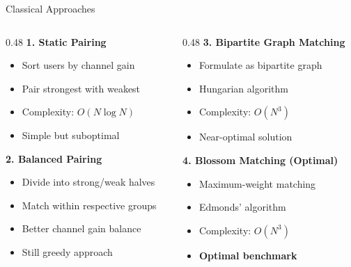 \documentclass[aspectratio=169]{beamer}
\begin{document}
\begin{frame}{Classical Approaches}
    \begin{columns}
        \begin{column}{0.48\textwidth}
            \textbf{1. Static Pairing}
            \begin{itemize}
                \item Sort users by channel gain
                \item Pair strongest with weakest
                \item Complexity: $O(N \log N)$
                \item Simple but suboptimal
            \end{itemize}
            
            \vspace{0.4cm}
            
            \textbf{2. Balanced Pairing}
            \begin{itemize}
                \item Divide into strong/weak halves
                \item Match within respective groups
                \item Better channel gain balance
                \item Still greedy approach
            \end{itemize}
        \end{column}
        
        \begin{column}{0.48\textwidth}
            \textbf{3. Bipartite Graph Matching}
            \begin{itemize}
                \item Formulate as bipartite graph
                \item Hungarian algorithm
                \item Complexity: $O(N^3)$
                \item Near-optimal solution
            \end{itemize}
            
            \vspace{0.4cm}
            
            \textbf{4. Blossom Matching (Optimal)}
            \begin{itemize}
                \item Maximum-weight matching
                \item Edmonds' algorithm
                \item Complexity: $O(N^3)$
                \item \textbf{Optimal benchmark}
            \end{itemize}
        \end{column}
    \end{columns}
\end{frame}
\end{document}
